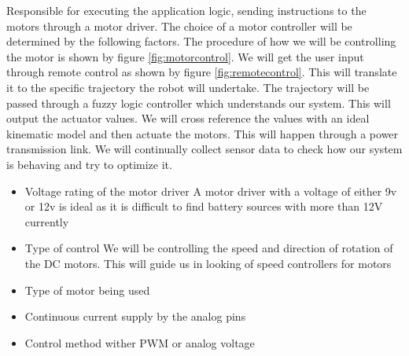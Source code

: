 Responsible for executing the application logic, sending instructions to the motors through a motor driver.
The choice of a motor controller will be determined by the following factors.
The procedure of how we will be controlling the motor is shown by figure \ref{fig:motorcontrol}. We will get the user input through remote control as shown by figure \ref{fig:remotecontrol}. This will translate it to the specific trajectory the robot will undertake. The trajectory will be passed through a fuzzy logic controller which understands our system. This will output the actuator values. We will cross reference the values with an ideal kinematic model and then actuate the motors. This will happen through a power transmission link. We will continually collect sensor data to check how our system is behaving and try to optimize it.

\begin{itemize}

    \item Voltage rating of the motor driver
    A motor driver with a voltage of either 9v or 12v is ideal as it is difficult to find battery sources with more than 12V currently
    
    \item Type of control
    We will be controlling the speed and direction of rotation of the \ac{DC} motors. This will guide us in looking of speed controllers for motors
    
    \item Type of motor being used
    
    \item Continuous current supply by the analog pins
    
    \item Control method wither \ac{PWM} or analog voltage
    
\end{itemize}


